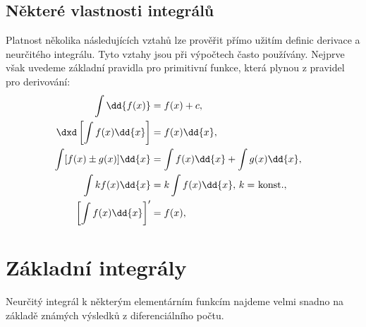     \subsection{Některé vlastnosti integrálů}  
      Platnost několika následujících vztahů lze prověřit přímo užitím deﬁnic derivace a neurčitého
      integrálu. Tyto vztahy jsou při výpočtech často používány. Nejprve však uvedeme základní
      pravidla pro primitivní funkce, která plynou z pravidel pro derivování:
      \begin{subequations}
        \begin{flalign}
          \int\dd{f(x)}                    
            &= f(x) + c,                                  &\label{mai:eq134} \\
          \dxd\left[\int f(x)\dd{x}\right] 
            &= f(x)\dd{x},                                &\label{mai:eq135} \\
          \int[f(x)\pm g(x)]\dd{x}
            &= \int f(x)\dd{x} + \int g(x)\dd{x},         &\label{mai:eq103} \\
          \int kf(x)\dd{x}      
            &=k\int f(x)\dd{x},\,\text{\(k=\) konst.},    &\label{mai:eq104}\raisetag{14pt} \\
          \left[\int f(x)\dd{x}\right]'    
            &= f(x),                                      &\label{mai:eq136}
        \end{flalign}
      \end{subequations}
      
  \section{Základní integrály}\label{mai:IchapVIIsecII} 
    Neurčitý integrál k některým elementárním funkcím najdeme velmi snadno na základě známých
    výsledků z diferenciálního počtu.
    
